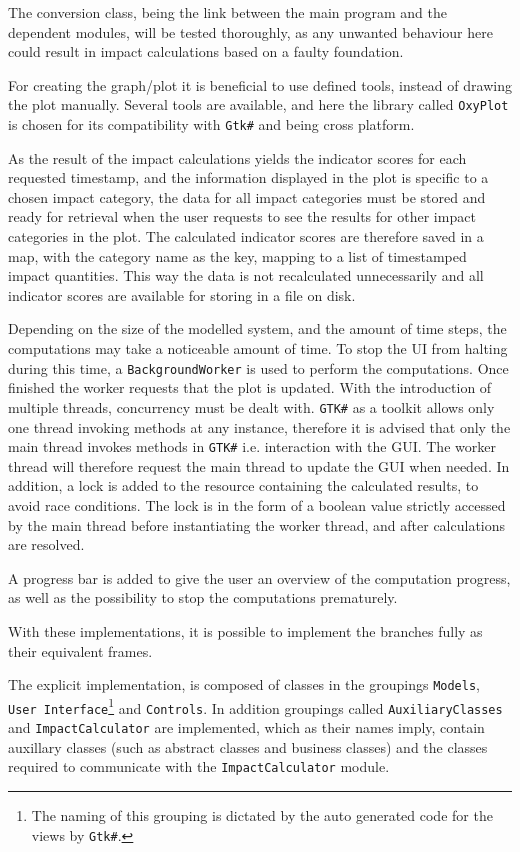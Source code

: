 The conversion class, being the link between the main program and the dependent modules, will be tested thoroughly, as any unwanted behaviour here could result in impact calculations based on a faulty foundation. 

For creating the graph/plot it is beneficial to use defined tools, instead of drawing the plot manually.  Several tools are available, and here the library called \texttt{OxyPlot} is chosen for its compatibility with \texttt{Gtk\#} and being cross platform. \cite{OxyPlotWeb}

As the result of the impact calculations yields the indicator scores for each requested timestamp, and the information displayed in the plot is specific to a chosen impact category, the data for all impact categories must be stored and ready for retrieval when the user requests to see the results for other impact categories in the plot. The calculated indicator scores are therefore saved in a map, with the category name as the key, mapping to a list of timestamped impact quantities. This way the data is not recalculated unnecessarily and all indicator scores are available for storing in a file on disk. 

Depending on the size of the modelled system, and the amount of time steps, the computations may take a noticeable amount of time. To stop the UI from halting during this time, a \texttt{BackgroundWorker} is used to perform the computations. Once finished the worker requests that the plot is updated. With the introduction of multiple threads, concurrency must be dealt with. \texttt{GTK\#} as a toolkit allows only one thread invoking methods at any instance, therefore it is advised that only the main thread invokes methods in \texttt{GTK\#} i.e. interaction with the GUI. The worker thread will therefore request the main thread to update the GUI when needed. \cite{GTK_Threading} In addition, a lock is added to the resource containing the calculated results, to avoid race conditions. The lock is in the form of a boolean value strictly accessed by the main thread before instantiating the worker thread, and after calculations are resolved.

A progress bar is added to give the user an overview of the computation progress, as well as the possibility to stop the computations prematurely.

\vspace{1 cm}
With these implementations, it is possible to implement the branches fully as their equivalent frames.

The explicit implementation, is composed of classes in the groupings \texttt{Models}, \texttt{User Interface}\footnote{The naming of this grouping is dictated by the auto generated code for the views by \texttt{Gtk\#}.} and \texttt{Controls}. In addition groupings called \texttt{AuxiliaryClasses} and \texttt{ImpactCalculator} are implemented, which as their names imply, contain auxillary classes (such as abstract classes and business classes) and the classes required to communicate with the \texttt{ImpactCalculator} module.